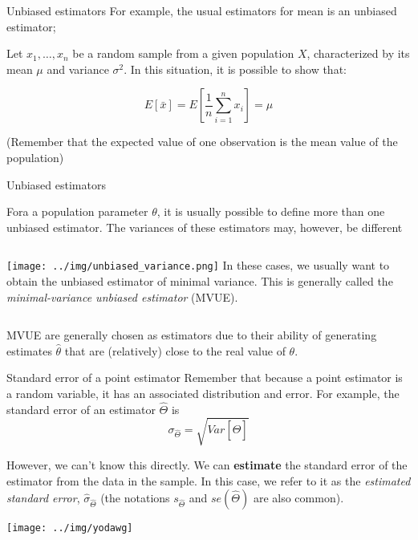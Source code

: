 \begin{frame}{Unbiased estimators}
For example, the usual estimators for mean is an unbiased estimator;
\bigskip

Let $x_1,\ldots,x_n$ be a random sample from a given population $X$, characterized by its mean $\mu$ and variance $\sigma^2$. In this situation, it is possible to show that:
\bigskip

\begin{equation*}
E\left[\bar{x}\right] = E\left[\frac{1}{n}\sum\limits_{i=1}^{n}x_i\right] = \mu
\end{equation*}
\vfill

(Remember that the expected value of one observation is the mean value of the population)

\end{frame}

\begin{frame}{Unbiased estimators}

Fora a population parameter $\theta$, it is usually possible to define more than one unbiased estimator. The variances of these estimators may, however, be different\bigskip

\begin{columns}[T]
    \vspace{-1.5em} \texttt{[image: ../img/unbiased\_variance.png]}
     In these cases, we usually want to obtain the unbiased estimator of minimal variance. This is generally called the \textit{minimal-variance unbiased estimator} (MVUE).
\end{columns}\bigskip

MVUE are generally chosen as estimators due to their ability of generating estimates $\hat{\theta}$ that are (relatively) close to the real value of $\theta$.
\end{frame}


\begin{frame}{Standard error of a point estimator}
Remember that because a point estimator is a random variable, it has an associated distribution and error. For example, the standard error of an estimator $\hat{\Theta}$ is
\begin{equation*}
\sigma_{\hat{\Theta}} = \sqrt{Var\left[\hat{\Theta}\right]}
\end{equation*}\bigskip

However, we can't know this directly. We can {\bf estimate} the standard error of the estimator from the data in the sample. In this case, we refer to it as the \textit{estimated standard error}, $\hat{\sigma}_{\hat{\Theta}}$ (the notations $s_{\hat{\Theta}}$ and $se(\hat{\Theta})$ are also common).

\hfill\texttt{[image: ../img/yodawg]}
\end{frame}

